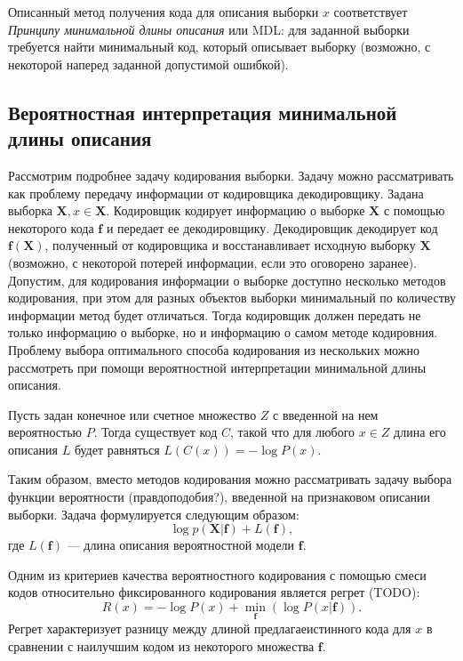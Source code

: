 \documentclass[../main.tex]{subfiles}
\begin{document}
Описанный метод получения кода для описания выборки $x$ соответствует \textit{Принципу минимальной длины описания} или MDL: для заданной выборки требуется найти минимальный код, который описывает выборку (возможно, с некоторой наперед заданной допустимой ошибкой).

\subsection{Вероятностная интерпретация минимальной длины описания}
Рассмотрим подробнее задачу кодирования выборки. Задачу можно рассматривать как проблему передачу информации от кодировщика декодировщику. Задана выборка $\mathbf{X}, x \in \mathbf{X}$. Кодировщик кодирует информацию о выборке $\mathbf{X}$ с помощью некоторого кода $\mathbf{f}$ и передает ее декодировщику. Декодировщик декодирует код $\mathbf{f}(\mathbf{X})$, полученный от кодировщика и восстанавливает исходную выборку $\mathbf{X}$ (возможно, с некоторой потерей информации, если это оговорено заранее).
Допустим, для кодирования информации о выборке доступно несколько методов кодирования, при этом для разных объектов выборки минимальный по количеству информации метод будет отличаться. Тогда кодировщик должен передать не только информацию о выборке, но и информацию о самом методе кодировния. Проблему выбора оптимального способа кодирования из нескольких можно рассмотреть при помощи вероятностной интерпретации минимальной длины описания.
\begin{theorembd}
Пусть задан конечное или счетное множество $Z$ с введенной на нем вероятностью $P$. Тогда существует код $C$, такой что для любого $x \in Z$ длина его описания $L$ будет равняться  $L(C(x)) = -\log P(x)$.
\end{theorembd}

Таким образом, вместо методов кодирования можно рассматривать задачу выбора функции вероятности (правдоподобия?), введенной на признаковом описании выборки. Задача формулируется следующим образом:
\[
    \log p(\mathbf{X}|\mathbf{f}) + L(\mathbf{f}), 
\]
где $L(\mathbf{f})$ --- длина описания вероятностной модели $\mathbf{f}$. 


Одним из критериев качества вероятностного кодирования с помощью смеси кодов относительно фиксированного кодирования является регрет (TODO):
\[
R(x) =  - \log P(x) + \min_{\mathbf{f}} (\log P(x|\mathbf{f})).
\]
Регрет характеризует разницу между длиной предлагаеистинного кода для $x$ в сравнении с наилучшим кодом из некоторого множества $\mathbf{f}$.
\end{document}
